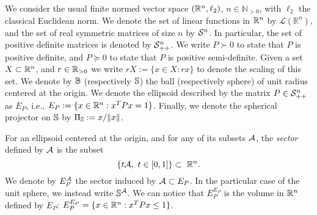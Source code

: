 We consider the usual finite normed vector space $(\mathbb{R}^n,\ell_2)$, $n \in \mathbb{N}_{> 0}$, with $\ell_2$ the classical Euclidean norm. We denote the set of linear functions in $\mathbb{R}^n$ by $\mathcal{L}(\mathbb{R}^n)$, and the set of real symmetric matrices of size $n$ by $\mathcal{S}^n$. In particular, the set of positive definite matrices is denoted by $\mathcal{S}^n_{++}$. We write $P \succ 0$ to state that $P$ is positive definite, and $P \succeq 0$ to state that $P$ is positive semi-definite. Given a set $X \subset \mathbb{R}^n$, and $r \in \mathbb{R}_{> 0}$ we write \mbox{$rX := \{x \in X : rx\}$} to denote the scaling of this set. We denote by $\mathbb{B}$ (respectively $\mathbb{S}$) the ball (respectively sphere) of unit radius centered at the origin.  We denote the ellipsoid described by the matrix $P \in \mathcal{S}^n_{++}$ as $E_P$, i.e., $E_P:= \{x \in \mathbb{R}^n: x^TPx = 1\}$. Finally, we denote the spherical projector on $\mathbb{S}$ by $\Pi_{\mathbb{S}} := x/\Vert x\Vert$. %


For an ellipsoid centered at the origin, and for any of its subsets $\mathcal{A}$, the \emph{sector} defined by $\mathcal{A}$ is the subset $$\{t \calA, \ t \in [0,1]\} \subset\ \R^n.$$ We denote by $E_P^{\mathcal{A}}$ the sector induced by $\mathcal{A} \subset E_P$. In the particular case of the unit sphere, we instead write $\mathbb{S}^{\mathcal{A}}$. We can notice that $E_P^{E_P}$ is the volume in $\mathbb{R}^n$ defined by $E_P$: $E_P^{E_P} = \{x \in \mathbb{R}^n: x^TPx \leq 1\}$.

